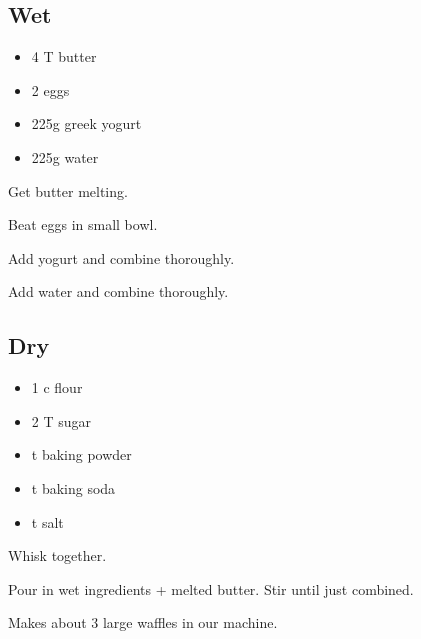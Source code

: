 \documentclass{article}
\begin{document}
\thispagestyle{fancy}
\begin{multicols*}{2}

\subsection*{Wet}
\begin{itemize}
    \item 4 T butter
    \item 2 eggs
    \item 225g greek yogurt
    \item 225g water
\end{itemize}
Get butter melting.

Beat eggs in small bowl.

Add yogurt and combine thoroughly.

Add water and combine thoroughly.


\vfill\null\columnbreak

\subsection*{Dry}
\begin{itemize}
    \item 1  c flour
    \item 2 T sugar
    \item {} t baking powder
    \item {} t baking soda
    \item {} t salt
\end{itemize}
Whisk together.

Pour in wet ingredients + melted butter. Stir until just combined.

Makes about 3 large waffles in our machine.



\end{multicols*}
\end{document}
